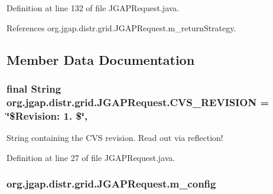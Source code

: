Definition at line 132 of file J\-G\-A\-P\-Request.\-java.



References org.\-jgap.\-distr.\-grid.\-J\-G\-A\-P\-Request.\-m\-\_\-return\-Strategy.



\subsection{Member Data Documentation}
\hypertarget{classorg_1_1jgap_1_1distr_1_1grid_1_1_j_g_a_p_request_af41c39d7f0229f6b63d7246db15f4dec}{
\subsubsection[{C\-V\-S\-\_\-\-R\-E\-V\-I\-S\-I\-O\-N}]{\setlength{\rightskip}{0pt plus 5cm}final String org.\-jgap.\-distr.\-grid.\-J\-G\-A\-P\-Request.\-C\-V\-S\-\_\-\-R\-E\-V\-I\-S\-I\-O\-N = \char`\"{}\$Revision\-: 1. \$\char`\"{}\hspace{0.3cm}{\ttfamily [static]}, {\ttfamily [private]}}}\label{classorg_1_1jgap_1_1distr_1_1grid_1_1_j_g_a_p_request_af41c39d7f0229f6b63d7246db15f4dec}
String containing the C\-V\-S revision. Read out via reflection! 

Definition at line 27 of file J\-G\-A\-P\-Request.\-java.

\hypertarget{classorg_1_1jgap_1_1distr_1_1grid_1_1_j_g_a_p_request_ad7ba848a75c9a1dbe215a44eec8d0067}{
\subsubsection[{m\-\_\-config}]{ org.\-jgap.\-distr.\-grid.\-J\-G\-A\-P\-Request.\-m\-\_\-config\hspace{0.3cm}{\ttfamily [private]}}}\label{classorg_1_1jgap_1_1distr_1_1grid_1_1_j_g_a_p_request_ad7ba848a75c9a1dbe215a44eec8d0067}


